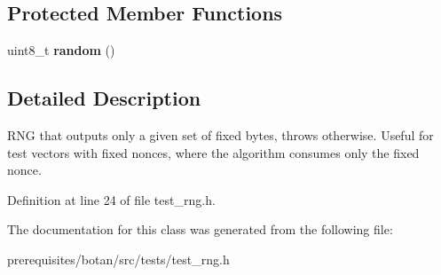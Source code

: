 \subsection*{Protected Member Functions}
\begin{DoxyCompactItemize}
\item 
\mbox{\label{class_botan___tests_1_1_fixed___output___r_n_g_adb7302fa4d80f15591053e5d7e8aed54}} 
uint8\+\_\+t {\bfseries random} ()
\end{DoxyCompactItemize}


\subsection{Detailed Description}
R\+NG that outputs only a given set of fixed bytes, throws otherwise. Useful for test vectors with fixed nonces, where the algorithm consumes only the fixed nonce. 

Definition at line 24 of file test\+\_\+rng.\+h.



The documentation for this class was generated from the following file\+:\begin{DoxyCompactItemize}
\item 
prerequisites/botan/src/tests/test\+\_\+rng.\+h\end{DoxyCompactItemize}
